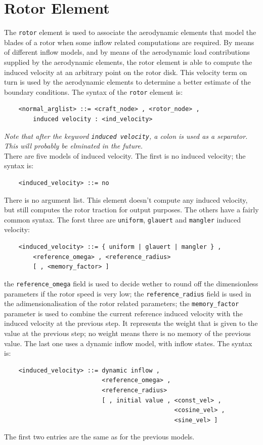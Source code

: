 \documentclass[10pt,dvips]{report}
\begin{document}
\section{Rotor Element}
The {\tt rotor} element is used to associate the aerodynamic elements that
model the blades of a rotor when some inflow related computations are
required. By means of different inflow models, and by means of the
aerodynamic load contributions supplied by the aerodynamic elements, the
rotor element is able to compute the induced velocity at an arbitrary point on
the rotor disk. This velocity term on turn is used by the aerodynamic
elements to determine a better estimate of the boundary conditions.
The syntax of the {\tt rotor} element is:
\begin{verbatim}
    <normal_arglist> ::= <craft_node> , <rotor_node> ,
        induced velocity : <ind_velocity>
\end{verbatim}
{\em 
    Note that after the keyword {\tt induced velocity}, a colon is used as a
    separator. This will probably be elminated in the future.
} \\
There are five models of induced velocity. 
The first is no induced velocity; the syntax is:
\begin{verbatim}
    <induced_velocity> ::= no
\end{verbatim}
There is no argument list. This element doesn't compute any induced
velocity, but still computes the rotor traction for output purposes.
The others have a fairly common syntax. The forst three are
{\tt uniform}, {\tt glauert} and {\tt mangler} induced velocity:
\begin{verbatim}
    <induced_velocity> ::= { uniform | glauert | mangler } , 
        <reference_omega> , <reference_radius> 
        [ , <memory_factor> ]
\end{verbatim}
the {\tt reference\_omega} field is used to decide wether to round off the
dimensionless parameters if the rotor speed is very low; the
{\tt reference\_radius} field is used in the adimensionalisation of the
rotor related parameters; the {\tt memory\_factor} parameter is used to
combine the current reference induced velocity with the induced velocity
at the previous step. It represents the weight that is given to the value at
the previous step; no weight means there is no memory of the previous value.
The last one uses a dynamic inflow model, with inflow states.
The syntax is:
\begin{verbatim}
    <induced_velocity> ::= dynamic inflow , 
                           <reference_omega> , 
                           <reference_radius> 
                           [ , initial value , <const_vel> ,
                                               <cosine_vel> ,
                                               <sine_vel> ]
\end{verbatim}
The first two entries are the same as for the previous models. 
\end{document}
